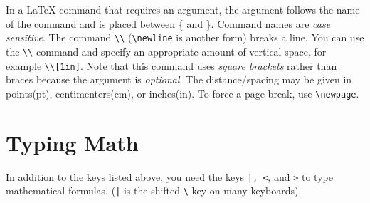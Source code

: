 \documentclass[12pt]{article}
\begin{document}
In a \LaTeX \; command that requires an argument, the argument follows the name of the command and is placed between \{ and \}. Command names are \emph{case sensitive}. The command \verb+\\+ (\verb+\newline+ is another form) breaks a line. You can use the \verb+\\+ command and specify an appropriate amount of vertical space, for example \verb+\\[1in]+. Note that this command uses \emph{square brackets} rather than braces because the argument  is \emph{optional}. The distance/spacing may be given in points(pt), centimenters(cm), or inches(in).  To force a page break, use \verb+\newpage+.

\section{Typing Math}
In addition to the keys listed above, you need the keys \verb+|, <+, and \verb+>+ to type mathematical formulas. (\verb+|+ is the shifted \verb+\+ key on many keyboards). \\
\end{document}
